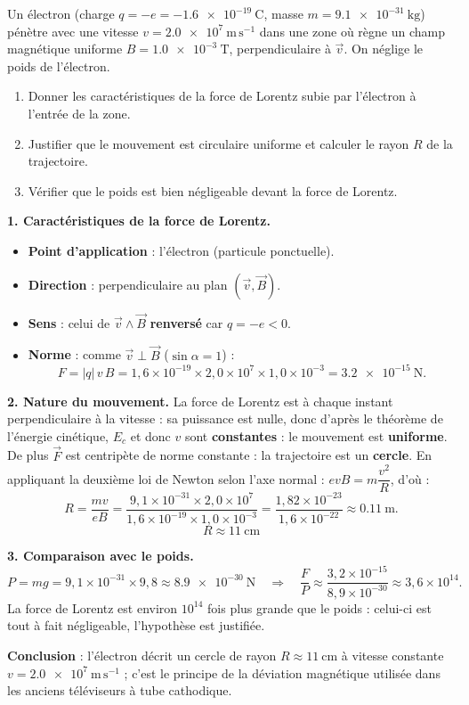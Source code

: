 \documentclass[11pt]{article}
\begin{document}
\begin{exoresolu}
Un électron (charge $q = -e = \num{-1,6e-19}\ \mathrm{C}$, masse $m = \num{9,1e-31}\ \mathrm{kg}$) pénètre avec une vitesse $v = \num{2,0e7}\ \mathrm{m\,s^{-1}}$ dans une zone où règne un champ magnétique uniforme $B = \num{1,0e-3}\ \mathrm{T}$, perpendiculaire à $\vec{v}$. On néglige le poids de l'électron.
\begin{enumerate}
\item Donner les caractéristiques de la force de Lorentz subie par l'électron à l'entrée de la zone.
\item Justifier que le mouvement est circulaire uniforme et calculer le rayon $R$ de la trajectoire.
\item Vérifier que le poids est bien négligeable devant la force de Lorentz.
\end{enumerate}
\tcblower
\textbf{1. Caractéristiques de la force de Lorentz.}
\begin{itemize}
\item \textbf{Point d'application} : l'électron (particule ponctuelle).
\item \textbf{Direction} : perpendiculaire au plan $(\vec{v}, \vec{B})$.
\item \textbf{Sens} : celui de $\vec{v} \wedge \vec{B}$ \textbf{renversé} car $q = -e < 0$.
\item \textbf{Norme} : comme $\vec{v} \perp \vec{B}$ ($\sin\alpha = 1$) :
\[ F = |q|\,v\,B = 1,6\times 10^{-19} \times 2,0\times 10^{7} \times 1,0\times 10^{-3} = \num{3,2e-15}\ \mathrm{N}. \]
\end{itemize}

\textbf{2. Nature du mouvement.} La force de Lorentz est à chaque instant perpendiculaire à la vitesse : sa puissance est nulle, donc d'après le théorème de l'énergie cinétique, $E_c$ et donc $v$ sont \textbf{constantes} : le mouvement est \textbf{uniforme}. De plus $\vec{F}$ est centripète de norme constante : la trajectoire est un \textbf{cercle}. En appliquant la deuxième loi de Newton selon l'axe normal : $evB = m\dfrac{v^2}{R}$, d'où :
\[ R = \dfrac{mv}{eB} = \dfrac{9,1\times 10^{-31} \times 2,0\times 10^{7}}{1,6\times 10^{-19} \times 1,0\times 10^{-3}} = \dfrac{1,82\times 10^{-23}}{1,6\times 10^{-22}} \approx \num{0,11}\ \mathrm{m}. \]
\[ \boxed{R \approx 11\ \mathrm{cm}} \]

\textbf{3. Comparaison avec le poids.}
\[ P = mg = 9,1\times 10^{-31} \times 9,8 \approx \num{8,9e-30}\ \mathrm{N} \quad\Longrightarrow\quad \dfrac{F}{P} \approx \dfrac{3,2\times 10^{-15}}{8,9\times 10^{-30}} \approx 3,6\times 10^{14}. \]
La force de Lorentz est environ $10^{14}$ fois plus grande que le poids : celui-ci est tout à fait négligeable, l'hypothèse est justifiée.

\textbf{Conclusion} : l'électron décrit un cercle de rayon $R \approx 11\ \mathrm{cm}$ à vitesse constante $v = \num{2,0e7}\ \mathrm{m\,s^{-1}}$ ; c'est le principe de la déviation magnétique utilisée dans les anciens téléviseurs à tube cathodique.
\end{exoresolu}
\end{document}
